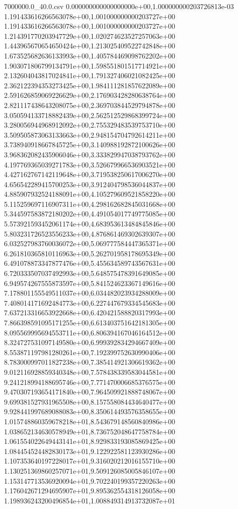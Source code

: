 \begin{filecontents*}{7000000.0_40.0.csv}
0.000000000000000000e+00,1.000000000203726813e-03
1.191433616266563078e+00,1.001000000000203727e+00
1.191433616266563078e+00,1.001000000000203727e+00
1.214391770203947729e+00,1.020274623527257063e+00
1.443965670654650424e+00,1.213025409522742848e+00
1.673525682636133993e+00,1.405784469098762202e+00
1.903071806799134791e+00,1.598551801517714921e+00
2.132604043817024841e+00,1.791327406021082425e+00
2.362122394353273425e+00,1.984111281857622089e+00
2.591626859069226629e+00,2.176903428280638764e+00
2.821117438643208075e+00,2.369703844529794878e+00
3.050594133718882439e+00,2.562512529868399724e+00
3.280056944968912092e+00,2.755329483539753710e+00
3.509505873063133663e+00,2.948154704792614211e+00
3.738940918667845725e+00,3.140988192872100626e+00
3.968362082435906046e+00,3.333829947038793762e+00
4.197769365039271783e+00,3.526679966536903521e+00
4.427162767142119648e+00,3.719538250617006270e+00
4.656542289415700253e+00,3.912404798536044837e+00
4.885907932524188091e+00,4.105279609521858220e+00
5.115259697116907311e+00,4.298162682845031668e+00
5.344597583872180202e+00,4.491054017749775085e+00
5.573921593452061174e+00,4.683953613484845846e+00
5.803231726523556233e+00,4.876861469302639307e+00
6.032527983760036072e+00,5.069777584447365371e+00
6.261810365810116963e+00,5.262701958178695349e+00
6.491078873347877476e+00,5.455634589743567631e+00
6.720333507037492993e+00,5.648575478391649085e+00
6.949574267555873597e+00,5.841524623367149616e+00
7.178801155549511037e+00,6.034482023934288009e+00
7.408014171692484773e+00,6.227447679334545683e+00
7.637213316653922668e+00,6.420421588820317993e+00
7.866398591095171255e+00,6.613403751642181305e+00
8.095569995694553711e+00,6.806394167046164512e+00
8.324727531097149580e+00,6.999392834294667409e+00
8.553871197981280261e+00,7.192399752630990406e+00
8.783000997011827238e+00,7.385414921306619362e+00
9.012116928859340348e+00,7.578438339583044581e+00
9.241218994188695746e+00,7.771470006685376575e+00
9.470307193654171840e+00,7.964509921888748067e+00
9.699381527931965508e+00,8.157558084434640477e+00
9.928441997689088083e+00,8.350614493576358655e+00
1.015748860359678218e+01,8.543679148560840986e+00
1.038652134630578949e+01,8.736752048647758784e+00
1.061554022649443141e+01,8.929833193085869425e+00
1.084454524482830173e+01,9.122922581123930286e+00
1.107353640197228017e+01,9.316020212016155710e+00
1.130251369860257071e+01,9.509126085005846107e+00
1.153147713536920094e+01,9.702240199357220263e+00
1.176042671294695907e+01,9.895362554318126058e+00
1.198936243200496854e+01,1.008849314913732087e+01

\end{filecontents*}
